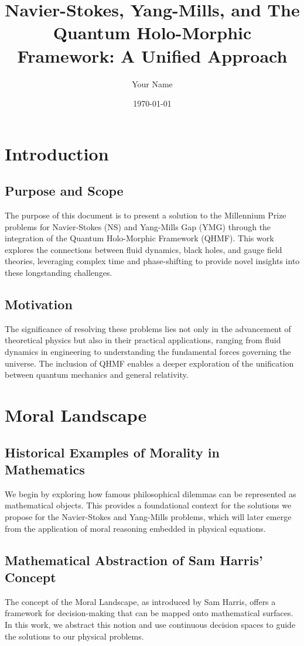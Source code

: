 \documentclass[12pt]{article}
\title{Navier-Stokes, Yang-Mills, and The Quantum Holo-Morphic Framework: A Unified Approach}
\author{Your Name}
\date{\today}
\begin{document}
\maketitle

\tableofcontents

\section{Introduction}
\subsection{Purpose and Scope}
The purpose of this document is to present a solution to the Millennium Prize problems for Navier-Stokes (NS) and Yang-Mills Gap (YMG) through the integration of the Quantum Holo-Morphic Framework (QHMF). This work explores the connections between fluid dynamics, black holes, and gauge field theories, leveraging complex time and phase-shifting to provide novel insights into these longstanding challenges.\\

\subsection{Motivation}
The significance of resolving these problems lies not only in the advancement of theoretical physics but also in their practical applications, ranging from fluid dynamics in engineering to understanding the fundamental forces governing the universe. The inclusion of QHMF enables a deeper exploration of the unification between quantum mechanics and general relativity.\\

\section{Moral Landscape}
\subsection{Historical Examples of Morality in Mathematics}
We begin by exploring how famous philosophical dilemmas can be represented as mathematical objects. This provides a foundational context for the solutions we propose for the Navier-Stokes and Yang-Mills problems, which will later emerge from the application of moral reasoning embedded in physical equations.\\

\subsection{Mathematical Abstraction of Sam Harris' Concept}
The concept of the Moral Landscape, as introduced by Sam Harris, offers a framework for decision-making that can be mapped onto mathematical surfaces. In this work, we abstract this notion and use continuous decision spaces to guide the solutions to our physical problems.\\
\end{document}
